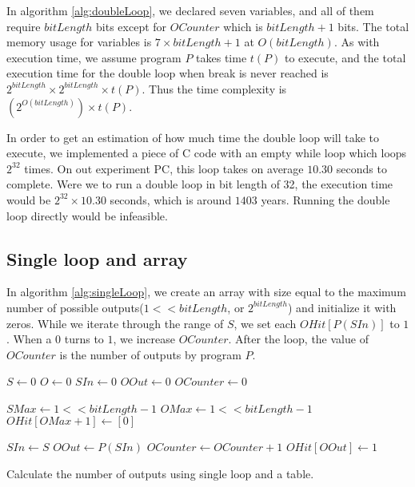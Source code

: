 In algorithm \ref{alg:doubleLoop}, we declared seven variables, and all of them require $bitLength$ bits except for $OCounter$ which is $bitLength + 1$ bits. The total memory usage for variables is $7 \times bitLength + 1$ at $O(bitLength)$. As with execution time, we assume program $P$ takes time $t(P)$ to execute, and the total execution time for the double loop when break is never reached is $2^{bitLength} \times 2^{bitLength} \times t(P)$. Thus the time complexity is $(2^{O(bitLength)}) \times t(P)$.

In order to get an estimation of how much time the double loop will take to execute, we implemented a piece of C code with an empty while loop which loops $2^{32}$ times. On out experiment PC, this loop takes on average $10.30$ seconds to complete. Were we to run a double loop in bit length of 32, the execution time would be $2^{32} \times 10.30$ seconds, which is around $1403$ years. Running the double loop directly would be infeasible.

\subsection{Single loop and array}
In algorithm \ref{alg:singleLoop}, we create an array with size equal to the maximum number of possible outputs($1 << bitLength$, or $2^{bitLength}$) and initialize it with zeros. While we iterate through the range of $S$, we set each $OHit[P(SIn)]$ to $1$. When a $0$ turns to $1$, we increase $OCounter$. After the loop, the value of $OCounter$ is the number of outputs by program $P$. 

\renewcommand{\algorithmiccomment}[1]{// #1}
\begin{algorithm}
\begin{algorithmic}

\STATE $S \leftarrow 0$
\STATE $O \leftarrow 0$
\STATE $SIn \leftarrow 0$
\STATE $OOut \leftarrow 0$
\STATE $OCounter \leftarrow 0$

\STATE $SMax \leftarrow 1 << bitLength - 1$
\STATE $OMax \leftarrow 1 << bitLength - 1$
\STATE $OHit[OMax + 1] \leftarrow [0]$

\STATE $SIn \leftarrow S$ 
\STATE $OOut \leftarrow P(SIn)$ 
\STATE $OCounter \leftarrow OCounter + 1$
\STATE $OHit[OOut] \leftarrow 1$
\ENDIF
\ENDFOR

\end{algorithmic}

\caption[Single loop]{Calculate the number of outputs using single loop and a table.}
\label{alg:singleLoop}
\end{algorithm}

